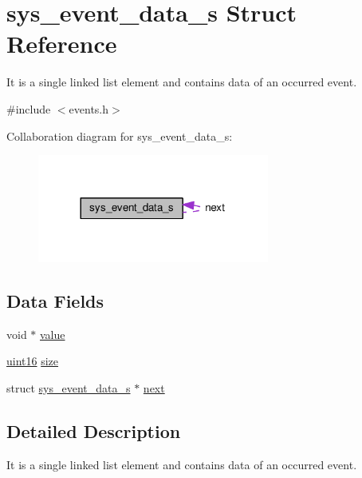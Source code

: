 \hypertarget{structsys__event__data__s}{}\section{sys\+\_\+event\+\_\+data\+\_\+s Struct Reference}
\label{structsys__event__data__s}


It is a single linked list element and contains data of an occurred event.  




{\ttfamily \#include $<$events.\+h$>$}



Collaboration diagram for sys\+\_\+event\+\_\+data\+\_\+s\+:\nopagebreak
\begin{figure}[H]
\begin{center}
\leavevmode
\includegraphics[width=216pt]{df/d2a/structsys__event__data__s__coll__graph}
\end{center}
\end{figure}
\subsection*{Data Fields}
\begin{DoxyCompactItemize}
\item 
void $\ast$ \hyperlink{structsys__event__data__s_a72c5ebbbee4b4509abcfb926d23f294f}{value}
\item 
\hyperlink{definitions_8h_a05f6b0ae8f6a6e135b0e290c25fe0e4e}{uint16} \hyperlink{structsys__event__data__s_a61e4846d66a617a9e5ed3602a3be63ef}{size}
\item 
struct \hyperlink{structsys__event__data__s}{sys\+\_\+event\+\_\+data\+\_\+s} $\ast$ \hyperlink{structsys__event__data__s_aa6f72c940fd46fc646876fe4271040a8}{next}
\end{DoxyCompactItemize}


\subsection{Detailed Description}
It is a single linked list element and contains data of an occurred event. 

